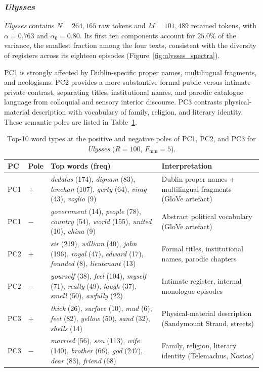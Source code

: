 \documentclass[12pt,a4paper]{article}
\begin{document}
\subsubsection{\emph{Ulysses}}
\label{sec:ulysses}

\emph{Ulysses} contains $N=264{,}165$ raw tokens and $M=101{,}489$
retained tokens, with $\alpha=0.763$ and $\alpha_0=0.80$. Its first
ten components account for $25.0\%$ of the variance, the smallest
fraction among the four texts, consistent with the diversity of
registers across its eighteen episodes
(Figure~\ref{fig:ulysses_spectra}).

PC1 is strongly affected by Dublin-specific proper names,
multilingual fragments, and neologisms. PC2 provides a more substantive
formal-public versus intimate-private contrast, separating titles,
institutional names, and parodic catalogue language from colloquial and
sensory interior discourse. PC3 contrasts physical-material description
with vocabulary of family, religion, and literary identity. These
semantic poles are listed in Table~\ref{tab:ulysses_pc}.

\begin{table}[htbp]
\centering
\caption{Top-10 word types at the positive and negative poles
of PC1, PC2, and PC3 for \emph{Ulysses} ($R=100$, $F_{\min}=5$).}
\label{tab:ulysses_pc}
\small
\setlength{\tabcolsep}{4pt}
\begin{tabular}{ll p{6.2cm} p{5.3cm}}
\toprule
PC & Pole & Top words (freq) & Interpretation \\
\midrule
PC1 & $+$ &
  \emph{dedalus} (174), \emph{dignam} (83),
  \emph{lenehan} (107), \emph{gerty} (64),
  \emph{virag} (43), \emph{voglio} (9)
  & Dublin proper names + multilingual fragments (GloVe artefact) \\
PC1 & $-$ &
  \emph{government} (14), \emph{people} (78),
  \emph{country} (54), \emph{world} (155),
  \emph{united} (10), \emph{china} (9)
  & Abstract political vocabulary (GloVe artefact) \\
\midrule
PC2 & $+$ &
  \emph{sir} (219), \emph{william} (40), \emph{john} (196),
  \emph{royal} (47), \emph{edward} (17),
  \emph{founded} (8), \emph{lieutenant} (13)
  & Formal titles, institutional names, parodic chapters \\
PC2 & $-$ &
  \emph{yourself} (38), \emph{feel} (104),
  \emph{myself} (71), \emph{really} (49),
  \emph{laugh} (37), \emph{smell} (50), \emph{awfully} (22)
  & Intimate register, internal monologue episodes \\
\midrule
PC3 & $+$ &
  \emph{thick} (26), \emph{surface} (10), \emph{mud} (6),
  \emph{feet} (82), \emph{yellow} (50),
  \emph{sand} (32), \emph{shells} (14)
  & Physical-material description (Sandymount Strand, streets) \\
PC3 & $-$ &
  \emph{married} (56), \emph{son} (113), \emph{wife} (140),
  \emph{brother} (66), \emph{god} (247),
  \emph{dear} (83), \emph{friend} (68)
  & Family, religion, literary identity (Telemachus, Nostos) \\
\bottomrule
\end{tabular}
\end{table}
\end{document}
